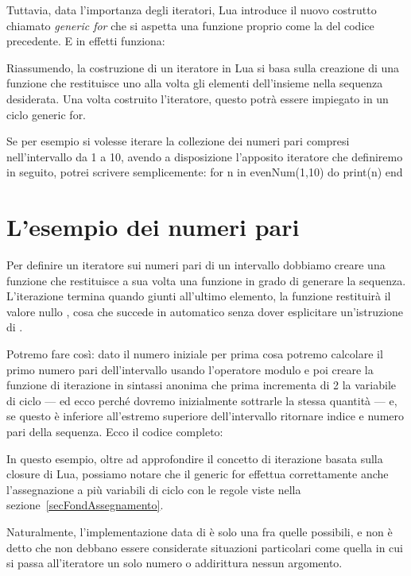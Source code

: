 Tuttavia, data l'importanza degli iteratori, Lua introduce il nuovo costrutto
chiamato \emph{generic for} che si aspetta una funzione proprio come la
 del codice precedente. E in effetti funziona:

Riassumendo, la costruzione di un iteratore in Lua si basa sulla creazione di
una funzione che restituisce uno alla volta gli elementi dell'insieme nella
sequenza desiderata. Una volta costruito l'iteratore, questo potrà essere
impiegato in un ciclo generic for.

Se per esempio si volesse iterare la collezione dei numeri pari compresi
nell'intervallo da 1 a 10, avendo a disposizione l'apposito iteratore
 che definiremo in seguito, potrei scrivere semplicemente:
\lines
for n in evenNum(1,10) do
    print(n)
end
\endlines
{}


\section{L'esempio dei numeri pari}

Per definire un iteratore sui numeri pari di un intervallo dobbiamo creare una
funzione che restituisce a sua volta una funzione in grado di generare la
sequenza. L'iterazione termina quando giunti all'ultimo elemento, la funzione
restituirà il valore nullo , cosa che succede in automatico senza dover
esplicitare un'istruzione di .

Potremo fare così: dato il numero iniziale per prima cosa potremo calcolare il
primo numero pari dell'intervallo usando l'operatore modulo \key{\%} e poi
creare la funzione di iterazione in sintassi anonima che prima incrementa di 2
la variabile di ciclo --- ed ecco perché dovremo inizialmente sottrarle la
stessa quantità --- e, se questo è inferiore all'estremo superiore
dell'intervallo ritornare indice e numero pari della sequenza. Ecco il codice
completo:

In questo esempio, oltre ad approfondire il concetto di iterazione basata sulla
closure di Lua, possiamo notare che il generic for effettua correttamente anche
l'assegnazione a più variabili di ciclo con le regole viste nella
sezione~\ref{secFondAssegnamento}.

Naturalmente, l'implementazione data di  è solo una fra quelle
possibili, e non è detto che non debbano essere considerate situazioni
particolari come quella in cui si passa all'iteratore un solo numero o
addirittura nessun argomento.


